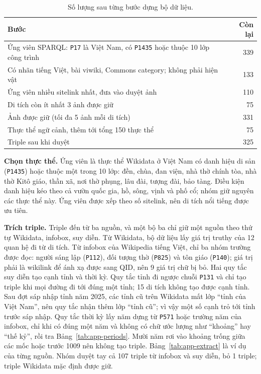 \begin{table}[!htb]
\centering
\caption{Số lượng sau từng bước dựng bộ dữ liệu.}
\label{tab:app-funnel}
\footnotesize
\begin{tabular}{@{}p{5.9cm}r@{}}
\toprule
Bước & Còn lại \\
\midrule
Ứng viên SPARQL: \texttt{P17} là Việt Nam, có \texttt{P1435} hoặc thuộc 10 lớp công trình & 339 \\
Có nhãn tiếng Việt, bài viwiki, Commons category; không phải hiện vật & 133 \\
Ứng viên nhiều sitelink nhất, đưa vào duyệt ảnh & 110 \\
Di tích còn ít nhất 3 ảnh được giữ & 75 \\
Ảnh được giữ (tối đa 5 ảnh mỗi di tích) & 331 \\
Thực thể ngữ cảnh, thêm tới tổng 150 thực thể & 75 \\
Triple sau khi duyệt & 325 \\
\bottomrule
\end{tabular}
\end{table}

\textbf{Chọn thực thể.} Ứng viên là thực thể Wikidata ở Việt Nam có danh hiệu di sản (\texttt{P1435}) hoặc thuộc
một trong 10 lớp: đền, chùa, đan viện, nhà thờ chính tòa, nhà thờ Kitô giáo, thần xã, nơi thờ phụng, lâu đài, tượng
đài, bảo tàng. Điều kiện danh hiệu kéo theo cả vườn quốc gia, hồ, sông, vịnh và phố cổ; nhóm giữ nguyên các thực
thể này. Ứng viên được xếp theo số sitelink, nên di tích nổi tiếng được ưu tiên.

\textbf{Trích triple.} Triple đến từ ba nguồn, và một bộ ba chỉ giữ một nguồn theo thứ tự Wikidata, infobox, suy
diễn. Từ Wikidata, bộ dữ liệu lấy giá trị truthy của 12 quan hệ đi từ di tích. Từ infobox của Wikipedia tiếng Việt,
chỉ ba nhóm trường được đọc: người sáng lập (\texttt{P112}), đối tượng thờ (\texttt{P825}) và tôn giáo
(\texttt{P140}); giá trị phải là wikilink để ánh xạ được sang QID, nên 9 giá trị chữ bị bỏ. Hai quy tắc suy diễn
tạo cạnh tỉnh và thời kỳ. Quy tắc tỉnh đi ngược chuỗi \texttt{P131} và chỉ tạo triple khi mọi đường đi tới đúng một
tỉnh; 15 di tích không tạo được cạnh tỉnh. Sau đợt sáp nhập tỉnh năm 2025, các tỉnh cũ trên Wikidata mất lớp
``tỉnh của Việt Nam'', nên quy tắc nhận thêm lớp ``tỉnh cũ''; vì vậy một số cạnh trỏ tới tỉnh trước sáp nhập. Quy tắc
thời kỳ lấy năm dựng từ \texttt{P571} hoặc trường năm của infobox, chỉ khi có đúng một năm và không có chữ ước lượng
như ``khoảng'' hay ``thế kỷ'', rồi tra Bảng~\ref{tab:app-periods}. Mười năm rơi vào khoảng trống giữa các mốc hoặc
trước 1009 nên không tạo triple. Bảng~\ref{tab:app-extract} là ví dụ của từng nguồn. Nhóm duyệt tay cả 107 triple
từ infobox và suy diễn, bỏ 1 triple; triple Wikidata mặc định được giữ.

